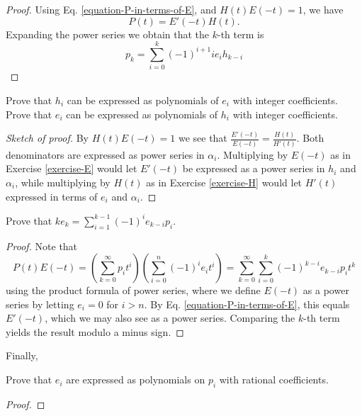 \begin{proof}
Using Eq. \ref{equation-P-in-terms-of-E}, and
$H(t)E(-t)=1$, we have
$$
P(t)=E'(-t)H(t).
$$
Expanding the power series we obtain that the
$k$-th term is
$$
p_k=\sum_{i=0}^k(-1)^{i+1}ie_ih_{k-i}
$$
\end{proof}

\begin{exercise}
\label{exercise-h-and-e}
Prove that $h_i$ can be expressed as
polynomials of $e_i$ with integer
coefficients. Prove that $e_i$ can be
expressed as polynomials of $h_i$ with
integer coefficients.
\end{exercise}

\begin{proof}[Sketch of proof]
By $H(t)E(-t)=1$ we see that
$\frac{E'(-t)}{E(-t)}=\frac{H(t)}{H'(t)}$.
Both
denominators are expressed as power series in
$\alpha_i$. Multiplying by $E(-t)$
as in Exercise \ref{exercise-E}
would let $E'(-t)$ be expressed as a power
series in $h_i$ and
$\alpha_i$, while multiplying by $H(t)$ as in
Exercise \ref{exercise-H} would
let $H'(t)$ expressed in terms of
$e_i$ and $\alpha_i$.
\end{proof}

\begin{exercise}
\label{exercise-newton-formula}
Prove that
$ke_k=\sum_{i=1}^{k-1}(-1)^ie_{k-i}p_i$.
\end{exercise}

\begin{proof}
Note that
$$
P(t)E(-t)=\left(\sum_{k=0}^{\infty}
p_it^i\right)
\left(\sum_{i=0}^n(-1)^ie_it^i\right)
=\sum_{k=0}^\infty \sum_{i=0}^k
(-1)^{k-i}e_{k-i}p_it^k
$$
using the product formula of power series,
where we define $E(-t)$ as a power
series by letting $e_i=0$ for $i>n$. By Eq.
\ref{equation-P-in-terms-of-E}, this
equals $E'(-t)$, which we may also see as a
power series. Comparing the $k$-th
term yields the result modulo a minus sign.
\end{proof}

\noindent
Finally,

\begin{exercise}
\label{exercise-symme-polyn-terms-newto}
Prove that $e_i$ are expressed as polynomials
on $p_i$ with rational
coefficients.
\end{exercise}

\begin{proof}

\end{proof}

